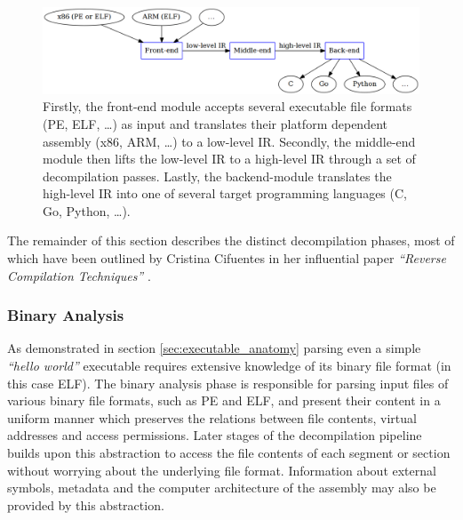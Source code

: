 \begin{figure}[htbp]
	\begin{center}
		\includegraphics[width=\textwidth]{inc/modules_overview.png}
		\caption{Firstly, the front-end module accepts several executable file formats (PE, ELF, …) as input and translates their platform dependent assembly (x86, ARM, …) to a low-level IR. Secondly, the middle-end module then lifts the low-level IR to a high-level IR through a set of decompilation passes. Lastly, the backend-module translates the high-level IR into one of several target programming languages (C, Go, Python, …).}
		\label{fig:modules_overview}
	\end{center}
\end{figure}

The remainder of this section describes the distinct decompilation phases, most of which have been outlined by Cristina Cifuentes in her influential paper \textit{``Reverse Compilation Techniques''} \cite{rev_comp}.


\subsubsection{Binary Analysis}
\label{sec:binary_analysis}

As demonstrated in section \ref{sec:executable_anatomy} parsing even a simple \textit{``hello world''} executable requires extensive knowledge of its binary file format (in this case ELF). The binary analysis phase is responsible for parsing input files of various binary file formats, such as PE and ELF, and present their content in a uniform manner which preserves the relations between file contents, virtual addresses and access permissions. Later stages of the decompilation pipeline builds upon this abstraction to access the file contents of each segment or section without worrying about the underlying file format. Information about external symbols, metadata and the computer architecture of the assembly may also be provided by this abstraction.


